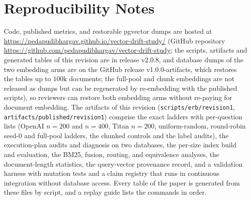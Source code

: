 \documentclass{ieeeaccess}
\makeatletter
\DeclareRobustCommand{\_}{\ifmmode\nfss@text{\textunderscore}\else\textunderscore\allowbreak\fi}
\makeatother
\begin{document}
\section{Reproducibility Notes}
\label{sec:repro}
Code, published metrics, and restorable pgvector dumps are hosted at \url{https://pedapudibhargav.github.io/vector-drift-study/} (GitHub repository \url{https://github.com/pedapudibhargav/vector-drift-study}; the scripts, artifacts and generated tables of this revision are in release v2.0.8, and database dumps of the two embedding arms are on the GitHub release v1.0.0-artifacts, which restores the tables up to $100\text{k}$ documents; the full-pool and chunk embeddings are not released as dumps but can be regenerated by re-embedding with the published scripts), so reviewers can restore both embedding arms without re-paying for document embedding. The artifacts of this revision (\texttt{scripts/erb/revision1}, \texttt{artifacts/published/revision1}) comprise the exact ladders with per-question lists (OpenAI $n{=}200$ and $n{=}400$, Titan $n{=}200$, uniform-random, round-robin seed-$0$ and full-pool ladders, the chunked controls and the label audits), the execution-plan audits and diagnosis on two databases, the per-size index build and evaluation, the BM25, fusion, routing, and equivalence analyses, the document-length statistics, the query-vector provenance record, and a validation harness with mutation tests and a claim registry that runs in continuous integration without database access. Every table of the paper is generated from these files by script, and a replay guide lists the commands in order.
\end{document}
